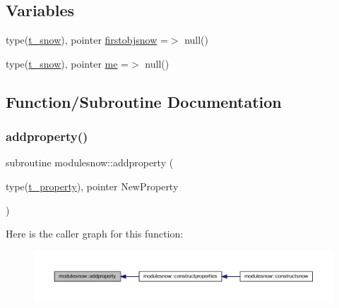 \subsection*{Variables}
\begin{DoxyCompactItemize}
\item 
type(\mbox{\hyperlink{structmodulesnow_1_1t__snow}{t\+\_\+snow}}), pointer \mbox{\hyperlink{namespacemodulesnow_a2d3dd12f242203d21e700da3e66dc4e0}{firstobjsnow}} =$>$ null()
\item 
type(\mbox{\hyperlink{structmodulesnow_1_1t__snow}{t\+\_\+snow}}), pointer \mbox{\hyperlink{namespacemodulesnow_aefbccc67c85115a076712d1c6bca86f5}{me}} =$>$ null()
\end{DoxyCompactItemize}


\subsection{Function/\+Subroutine Documentation}
\mbox{\label{namespacemodulesnow_ab95e7de76c7c2b25d88721edc294e518}} 
\subsubsection{\texorpdfstring{addproperty()}{addproperty()}}
{\footnotesize\ttfamily subroutine modulesnow\+::addproperty (\begin{DoxyParamCaption}\item[{type(\mbox{\hyperlink{structmodulesnow_1_1t__property}{t\+\_\+property}}), pointer}]{New\+Property }\end{DoxyParamCaption})\hspace{0.3cm}{\ttfamily [private]}}

Here is the caller graph for this function\+:\nopagebreak
\begin{figure}[H]
\begin{center}
\leavevmode
\includegraphics[width=350pt]{namespacemodulesnow_ab95e7de76c7c2b25d88721edc294e518_icgraph}
\end{center}
\end{figure}
\mbox{\label{namespacemodulesnow_a752062220e47eb96c5b9ecdc75609c34}} 
